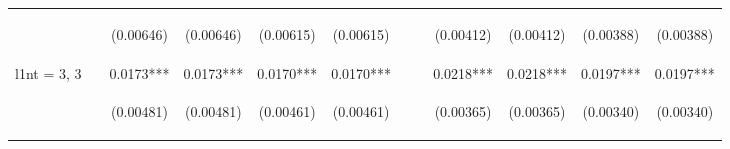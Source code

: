 \documentclass[]{article}
\begin{document}
\begin{center}
\begin{tabular}{lccccccccccc}
\vspace{4pt} & \begin{footnotesize}\end{footnotesize} & \begin{footnotesize}(0.00646)\end{footnotesize} & \begin{footnotesize}(0.00646)\end{footnotesize} & \begin{footnotesize}(0.00615)\end{footnotesize} & \begin{footnotesize}(0.00615)\end{footnotesize} & \begin{footnotesize}\end{footnotesize} & \begin{footnotesize}\end{footnotesize} & \begin{footnotesize}(0.00412)\end{footnotesize} & \begin{footnotesize}(0.00412)\end{footnotesize} & \begin{footnotesize}(0.00388)\end{footnotesize} & \begin{footnotesize}(0.00388)\end{footnotesize} \\
l1nt = 3, 3 &  & 0.0173*** & 0.0173*** & 0.0170*** & 0.0170*** &  &  & 0.0218*** & 0.0218*** & 0.0197*** & 0.0197*** \\
\vspace{4pt} & \begin{footnotesize}\end{footnotesize} & \begin{footnotesize}(0.00481)\end{footnotesize} & \begin{footnotesize}(0.00481)\end{footnotesize} & \begin{footnotesize}(0.00461)\end{footnotesize} & \begin{footnotesize}(0.00461)\end{footnotesize} & \begin{footnotesize}\end{footnotesize} & \begin{footnotesize}\end{footnotesize} & \begin{footnotesize}(0.00365)\end{footnotesize} & \begin{footnotesize}(0.00365)\end{footnotesize} & \begin{footnotesize}(0.00340)\end{footnotesize} & \begin{footnotesize}(0.00340)\end{footnotesize} \\

\end{tabular}
\end{center}
\end{document}
